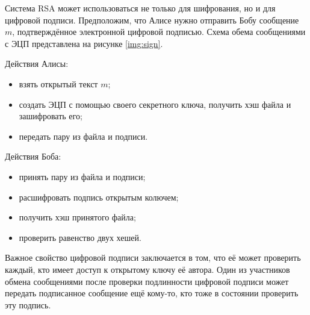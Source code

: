 Система RSA может использоваться не только для шифрования, но и для цифровой подписи. Предположим, что Алисе нужно отправить Бобу сообщение $m$, подтверждённое электронной цифровой подписью. Схема обема сообщениями с ЭЦП представлена на рисунке \ref{img:sign}.

\FloatBarrier

Действия Алисы:
\begin{itemize}[label=---]
	\item взять открытый текст $m$;
	\item создать ЭЦП с помощью своего секретного ключа, получить хэш файла и зашифровать его;
	\item передать пару из файла и подписи.
\end{itemize}

Действия Боба:
\begin{itemize}[label=---]
	\item принять пару из файла и подписи;
	\item расшифровать подпись открытым колючем;
	\item получить хэш принятого файла;
	\item проверить равенство двух хешей.
\end{itemize}

Важное свойство цифровой подписи заключается в том, что её может проверить каждый, кто имеет доступ к открытому ключу её автора. Один из участников обмена сообщениями после проверки подлинности цифровой подписи может передать подписанное сообщение ещё кому-то, кто тоже в состоянии проверить эту подпись. 











